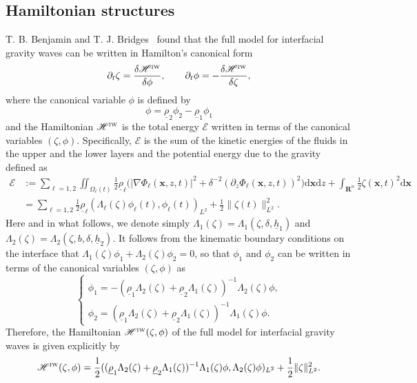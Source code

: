 \documentclass[11pt,leqno]{article}
\numberwithin{equation}{section}
\numberwithin{figure}{section}
\begin{document}
\subsection{Hamiltonian structures}\label{S.def-hamiltonian}
%
T. B. Benjamin and T. J. Bridges~\cite{BenjaminBridges1997} found that the full model for interfacial gravity waves 
can be written in Hamilton's canonical form 
%
\[
\partial_t\zeta = \frac{\delta\mathscr{H}^{\mbox{\rm\tiny IW}}}{\delta\phi}, \qquad
\partial_t\phi = -\frac{\delta\mathscr{H}^{\mbox{\rm\tiny IW}}}{\delta\zeta},
\]
%
where the canonical variable $\phi$ is defined by 
%
\begin{equation}\label{intro:cv}
	\phi = \underline{\rho}_2\phi_2 - \underline{\rho}_1\phi_1
\end{equation}
% 
and the Hamiltonian $\mathscr{H}^{\mbox{\rm\tiny IW}}$ is the total 
energy $\mathscr{E}$ written in terms of the canonical variables $(\zeta,\phi)$. 
Specifically, $\mathscr{E}$ is the sum of the kinetic energies of the fluids in the upper 
and the lower layers and the potential energy due to the gravity defined as
%
\begin{align*}
\mathscr{E}
&:= \sum_{\ell=1,2}\iint_{\Omega_\ell(t)}\frac12\underline{\rho}_\ell
 \bigl( |\nabla\Phi_\ell(\bm{x},z,t)|^2 + \delta^{-2}(\partial_z\Phi_\ell(\bm{x},z,t))^2 \bigr) \mathrm{d}\bm{x}\mathrm{d}z 
 + \int_{\mathbf{R}^n}\frac12\zeta(\bm{x},t)^2\mathrm{d}\bm{x} \\
&= \sum_{\ell=1,2}\frac12\underline{\rho}_\ell(\Lambda_\ell(\zeta)\phi_\ell(t),\phi_\ell(t))_{L^2}
 + \frac12\|\zeta(t)\|_{L^2}^2.
\end{align*}
%
Here and in what follows, we denote simply $\Lambda_1(\zeta)=\Lambda_1(\zeta,\delta,\underline{h}_1)$ 
and  $\Lambda_2(\zeta)=\Lambda_2(\zeta,b,\delta,\underline{h}_2)$. 
It follows from the kinematic boundary conditions on the interface that 
$\Lambda_1(\zeta)\phi_1+\Lambda_2(\zeta)\phi_2=0$, so that $\phi_1$ and $\phi_2$ can be written in terms of 
the canonical variables $(\zeta,\phi)$ as 
%
\[
\begin{cases}
\phi_1 = -(\underline{\rho}_1\Lambda_2(\zeta)+\underline{\rho}_2\Lambda_1(\zeta))^{-1}\Lambda_2(\zeta)\phi, \\
\phi_2 = (\underline{\rho}_1\Lambda_2(\zeta)+\underline{\rho}_2\Lambda_1(\zeta))^{-1}\Lambda_1(\zeta)\phi.
\end{cases}
\]
%
Therefore, the Hamiltonian $\mathscr{H}^{\mbox{\rm\tiny IW}}(\zeta,\phi)$ of the full model for interfacial gravity waves 
is given explicitly by 
%
\begin{equation}\label{Hamiltonian-full-model}
\mathscr{H}^{\mbox{\rm\tiny IW}}(\zeta,\phi)
= \frac12((\underline{\rho}_1\Lambda_2(\zeta)+\underline{\rho}_2\Lambda_1(\zeta))^{-1}\Lambda_1(\zeta)\phi, 
  \Lambda_2(\zeta)\phi)_{L^2} + \frac12\|\zeta\|_{L^2}^2.
\end{equation}
\end{document}
